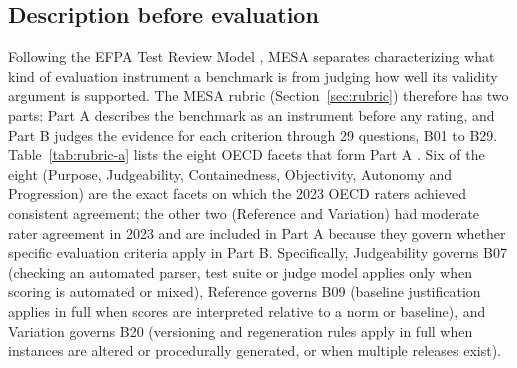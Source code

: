 \documentclass[10pt,conference]{IEEEtran}
\begin{document}
\subsection{Description before evaluation}
Following the EFPA Test Review Model \cite{efpa_test_review_model_2025}, MESA separates characterizing what kind of evaluation instrument a benchmark is from judging how well its validity argument is supported. The MESA rubric (Section~\ref{sec:rubric}) therefore has two parts: Part A describes the benchmark as an instrument before any rating, and Part B judges the evidence for each criterion through 29 questions, B01 to B29. Table~\ref{tab:rubric-a} lists the eight OECD facets that form Part A \cite{cohn_hernandez_orallo_oecd_2023}. Six of the eight (Purpose, Judgeability, Containedness, Objectivity, Autonomy and Progression) are the exact facets on which the 2023 OECD raters achieved consistent agreement; the other two (Reference and Variation) had moderate rater agreement in 2023 and are included in Part A because they govern whether specific evaluation criteria apply in Part B. Specifically, Judgeability governs B07 (checking an automated parser, test suite or judge model applies only when scoring is automated or mixed), Reference governs B09 (baseline justification applies in full when scores are interpreted relative to a norm or baseline), and Variation governs B20 (versioning and regeneration rules apply in full when instances are altered or procedurally generated, or when multiple releases exist).
\end{document}
